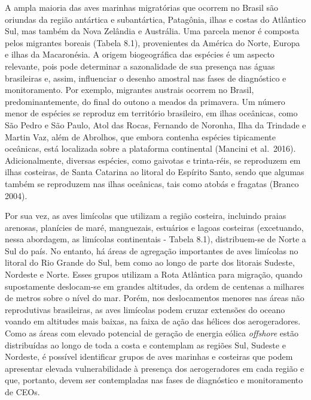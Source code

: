 \documentclass[
  oneside]{scrbook}
\begin{document}
A ampla maioria das aves marinhas migratórias que ocorrem no Brasil são oriundas da região antártica e subantártica, Patagônia, ilhas e costas do Atlântico Sul, mas também da Nova Zelândia e Austrália. Uma parcela menor é composta pelos migrantes boreais (Tabela 8.1), provenientes da América do Norte, Europa e ilhas da Macaronésia. A origem biogeográfica das espécies é um aspecto relevante, pois pode determinar a sazonalidade de sua presença nas águas brasileiras e, assim, influenciar o desenho amostral nas fases de diagnóstico e monitoramento. Por exemplo, migrantes austrais ocorrem no Brasil, predominantemente, do final do outono a meados da primavera. Um número menor de espécies se reproduz em território brasileiro, em ilhas oceânicas, como São Pedro e São Paulo, Atol das Rocas, Fernando de Noronha, Ilha da Trindade e Martin Vaz, além de Abrolhos, que embora contenha espécies tipicamente oceânicas, está localizada sobre a plataforma continental (Mancini et al.~2016). Adicionalmente, diversas espécies, como gaivotas e trinta-réis, se reproduzem em ilhas costeiras, de Santa Catarina ao litoral do Espírito Santo, sendo que algumas também se reproduzem nas ilhas oceânicas, tais como atobás e fragatas (Branco 2004).

Por sua vez, as aves limícolas que utilizam a região costeira, incluindo praias arenosas, planícies de maré, manguezais, estuários e lagoas costeiras (excetuando, nessa abordagem, as limícolas continentais - Tabela 8.1), distribuem-se de Norte a Sul do país. No entanto, há áreas de agregação importantes de aves limícolas no litoral do Rio Grande do Sul, bem como ao longo de parte dos litorais Sudeste, Nordeste e Norte. Esses grupos utilizam a Rota Atlântica para migração, quando supostamente deslocam-se em grandes altitudes, da ordem de centenas a milhares de metros sobre o nível do mar. Porém, nos deslocamentos menores nas áreas não reprodutivas brasileiras, as aves limícolas podem cruzar extensões do oceano voando em altitudes mais baixas, na faixa de ação das hélices dos aerogeradores. Como as áreas com elevado potencial de geração de energia eólica \emph{offshore} estão distribuídas ao longo de toda a costa e contemplam as regiões Sul, Sudeste e Nordeste, é possível identificar grupos de aves marinhas e costeiras que podem apresentar elevada vulnerabilidade à presença dos aerogeradores em cada região e que, portanto, devem ser contempladas nas fases de diagnóstico e monitoramento de CEOs.
\end{document}
